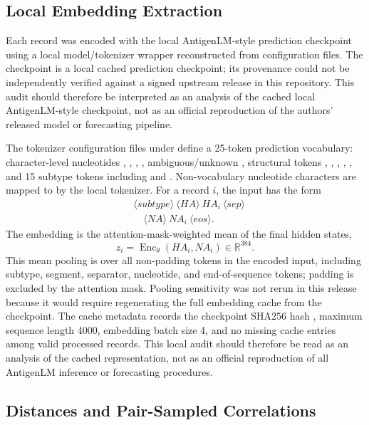 \documentclass[11pt]{article}
\newcommand{\Enc}{\operatorname{Enc}}
\newcommand{\R}{\mathbb{R}}
\begin{document}
\subsection{Local Embedding Extraction}

Each record was encoded with the local AntigenLM-style prediction checkpoint  using a local model/tokenizer wrapper reconstructed from configuration files. The checkpoint is a local cached prediction checkpoint; its provenance could not be independently verified against a signed upstream release in this repository. This audit should therefore be interpreted as an analysis of the cached local AntigenLM-style checkpoint, not as an official reproduction of the authors' released model or forecasting pipeline.

The tokenizer configuration files under  define a 25-token prediction vocabulary: character-level nucleotides , , , , ambiguous/unknown , structural tokens , , , , , and 15 subtype tokens including  and . Non-vocabulary nucleotide characters are mapped to  by the local tokenizer. For a record $i$, the input has the form
\[
\begin{aligned}
&\langle subtype\rangle \ \langle HA\rangle \ HA_i \ \langle sep\rangle \\
&\quad \langle NA\rangle \ NA_i \ \langle eos\rangle .
\end{aligned}
\]
The embedding is the attention-mask-weighted mean of the final hidden states,
\[
z_i=\Enc_{\theta}(HA_i,NA_i)\in\R^{384}.
\]
This mean pooling is over all non-padding tokens in the encoded input, including subtype, segment, separator, nucleotide, and end-of-sequence tokens; padding is excluded by the attention mask. Pooling sensitivity was not rerun in this release because it would require regenerating the full embedding cache from the checkpoint. The cache metadata records the checkpoint SHA256 hash
, maximum sequence length 4000, embedding batch size 4, and no missing cache entries among valid processed records. This local audit should therefore be read as an analysis of the cached representation, not as an official reproduction of all AntigenLM inference or forecasting procedures.

\subsection{Distances and Pair-Sampled Correlations}
\end{document}
